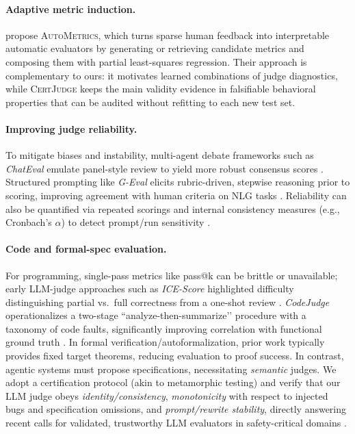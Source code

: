 \documentclass[numbers]{article}
\begin{document}
\paragraph{Adaptive metric induction.}
\citet{ryan2025autometrics} propose \textsc{AutoMetrics}, which turns sparse human feedback into interpretable automatic evaluators by generating or retrieving candidate metrics and composing them with partial least-squares regression.
Their approach is complementary to ours: it motivates learned combinations of judge diagnostics, while \textsc{CertJudge} keeps the main validity evidence in falsifiable behavioral properties that can be audited without refitting to each new test set.

\paragraph{Improving judge reliability.}
To mitigate biases and instability, multi-agent debate frameworks such as \emph{ChatEval} emulate panel-style review to yield more robust consensus scores \citep{Chan2024ChatEval}. Structured prompting like \emph{G-Eval} elicits rubric-driven, stepwise reasoning prior to scoring, improving agreement with human criteria on NLG tasks \citep{Liu2023GEval}. Reliability can also be quantified via repeated scorings and internal consistency measures (e.g., Cronbach’s $\alpha$) to detect prompt/run sensitivity \citep{Li2024TrustLLMJudgments}.

\paragraph{Code and formal-spec evaluation.}
For programming, single-pass metrics like pass@k can be brittle or unavailable; early LLM-judge approaches such as \emph{ICE-Score} highlighted difficulty distinguishing partial vs.\ full correctness from a one-shot review \citep{Zhuo2024ICEScore}. \emph{CodeJudge} operationalizes a two-stage “analyze-then-summarize’’ procedure with a taxonomy of code faults, significantly improving correlation with functional ground truth \citep{TongZhang2024CodeJudge}. In formal verification/autoformalization, prior work typically provides fixed target theorems, reducing evaluation to proof success. In contrast, agentic systems must propose specifications, necessitating \emph{semantic} judges. We adopt a certification protocol (akin to metamorphic testing) and verify that our LLM judge obeys \emph{identity/consistency}, \emph{monotonicity} with respect to injected bugs and specification omissions, and \emph{prompt/rewrite stability}, directly answering recent calls for validated, trustworthy LLM evaluators in safety-critical domains \citep{Kocmi2024HumanVsLLM,Li2024TrustLLMJudgments}.
\end{document}
